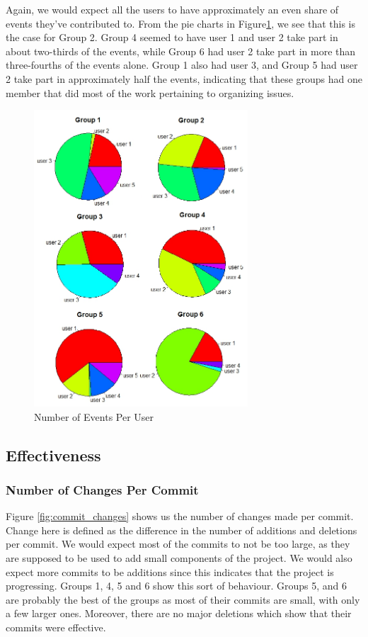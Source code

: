 \documentclass{acm_proc_article-sp}
\begin{document}
Again, we would expect all the users to have approximately an even share of events they've contributed to. From the pie charts in Figure\ref{fig:issue_create}, we see that this is the case for Group 2. Group 4 seemed to have user 1 and user 2 take part in about two-thirds of the events, while Group 6 had user 2 take part in more than three-fourths of the events alone. Group 1 also had user 3, and Group 5 had user 2 take part in approximately half the events, indicating that these groups had one member that did most of the work pertaining to organizing issues.

\begin{figure}[h]
\centering
\includegraphics[width=8cm]{img/issue_create}
\caption{Number of Events Per User}
\label{fig:issue_create}
\end{figure}

\subsection{Effectiveness}

\subsubsection{Number of Changes Per Commit}
Figure \ref{fig:commit_changes} shows us the number of changes made per commit. Change here is defined as the difference in the number of additions and deletions per commit. We would expect most of the commits to not be too large, as they are supposed to be used to add small components of the project. We would also expect more commits to be additions since this indicates that the project is progressing. Groups 1, 4, 5 and 6 show this sort of behaviour. Groups 5, and 6 are probably the best of the groups as most of their commits are small, with only a few larger ones. Moreover, there are no major deletions which show that their commits were effective.
\end{document}
